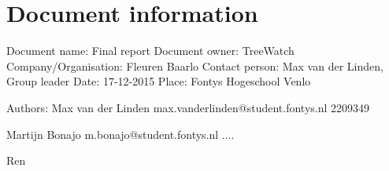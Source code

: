 \section{Document information}
Document name: 				Final report
Document owner:				TreeWatch
Company/Organisation:	Fleuren Baarlo
Contact person:					Max van der Linden, Group leader
Date:									17-12-2015
Place:									Fontys Hogeschool Venlo

Authors:							Max van der Linden
										max.vanderlinden@student.fontys.nl
										2209349
										
										Martijn Bonajo
										m.bonajo@student.fontys.nl
										....
										
										Ren